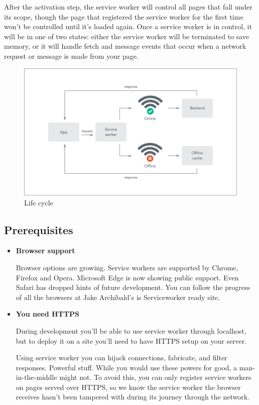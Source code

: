 \documentclass[14pt,a4paper,final]{extreport}
\begin{document}
After the activation step, the service worker will control all pages that fall under its scope, though the page that registered the service worker for the first time won't be controlled until it's loaded again. Once a service worker is in control, it will be in one of two states: either the service worker will be terminated to save memory, or it will handle fetch and message events that occur when a network request or message is made from your page.
\newpage
\begin{figure}[h]
		\includegraphics[scale=.56]{P1.png}
	
    \caption{Life cycle}
\end{figure}
\subsection{Prerequisites}
\begin{itemize}
    \item \textbf{Browser support}

Browser options are growing. Service workers are supported by Chrome, Firefox and Opera. Microsoft Edge is now showing public support. Even Safari has dropped hints of future development. You can follow the progress of all the browsers at Jake Archibald's is Serviceworker ready site.

\item \textbf{You need HTTPS}

During development you'll be able to use service worker through localhost, but to deploy it on a site you'll need to have HTTPS setup on your server.

Using service worker you can hijack connections, fabricate, and filter responses. Powerful stuff. While you would use these powers for good, a man-in-the-middle might not. To avoid this, you can only register service workers on pages served over HTTPS, so we know the service worker the browser receives hasn't been tampered with during its journey through the network.
\end{itemize}
\end{document}
